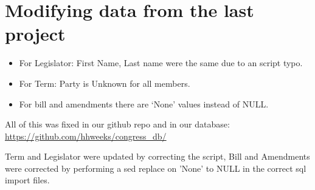 \documentclass[11pt]{article}
\begin{document}
\section{Modifying data from the last project}
\label{sec-4}

\begin{itemize}
\item For Legislator: First Name, Last name were the same due to an script typo.

\item For Term: Party is Unknown for all members.

\item For bill and amendments there are ‘None’ values instead of NULL.
\end{itemize}

All of this was fixed in our github repo and in our database: \url{https://github.com/hhweeks/congress_db/}

Term and Legislator were updated by correcting the script, Bill and Amendments were corrected by
performing a sed replace on 'None' to NULL in the correct sql import files.
\end{document}

